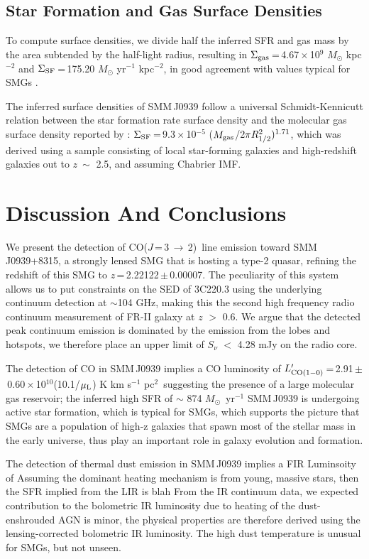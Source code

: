 \documentclass[twocolumn,apj,numberedappendix]{emulateapj}
\newcommand{\Msun}{\mbox{$M_{\odot}$}}
\newcommand{\CO}{\mbox{CO($J$\,=\,3\,$\rightarrow$\,2) }}
\newcommand{\Lp}{\mbox{$L^{\prime}_{\rm CO(1-0)}$}}
\newcommand{\LpU}{\mbox{K\,\,km\,\,s$^{-1}$\,\,pc$^2$}}
\newcommand{\pmOne}{\mbox{$^{-1}$}}
\begin{document}
\subsection{Star Formation and Gas Surface Densities}
To compute surface densities, we divide half the inferred SFR and gas mass by the area subtended by the half-light 
radius, resulting in $\Sigma_{\rm gas}$\,=\,4.67\,$\times$\,10$^9$\,\,\Msun\,\,kpc$^{-2}$ and $\Sigma_{\rm SF}$\,=\,175.20\,\,\Msun\,\,yr\pmOne\,\,kpc$^{-2}$, in good agreement with values typical for SMGs \citep{Tacconi08a}. 

The inferred surface densities of SMM\,J0939 follow a universal Schmidt-Kennicutt relation between the star formation rate
surface density and the molecular gas surface density reported by \citet{B07a}: $\Sigma_{\rm SF}$\,=\,9.3\,$\times$\,10$^{-5}$ ($M_{\rm gas}$/2$\pi R_{\rm 1/2}^2)^{1.71}$, which was derived using a sample consisting of local star-forming galaxies and high-redshift 
galaxies
out to $z\ \sim$ 2.5, and assuming Chabrier IMF. 

\section{Discussion And Conclusions} \label{sec:conclusions}
We present the detection of \CO line emission toward SMM\,J0939+8315, a strongly lensed SMG that is hosting a type-2 quasar, refining the redshift of this SMG to $z$\,=\,2.22122\,$\pm$\,0.00007. The peculiarity of this system allows us to put constraints on the SED of 3C220.3 using the underlying continuum detection at $\sim$104 GHz, making this the second high frequency radio continuum measurement of FR-II galaxy at $z$ $>$ 0.6. We argue that the detected peak continuum emission is dominated by the emission from the lobes and hotspots, we therefore place an upper limit of $S_\nu$ $<$ 4.28 mJy on the radio core. 

The detection of CO in SMM\,J0939 
implies a CO luminosity of \Lp\,=\,2.91\,$\pm$\,0.60\,$\times$\,10$^{10}$(10.1/$\mu_{\rm L}$)\,\,\LpU\, suggesting the presence of a large molecular gas reservoir; the inferred high SFR of $\sim$ 874 \Msun\ yr\pmOne 
 SMM\,J0939 is undergoing 
active star formation, which is typical for SMGs, 
which supports the picture that SMGs are a 
population of high-z galaxies that spawn most of the stellar mass in the early universe, thus play an important role 
in galaxy evolution and formation. 

The detection of thermal dust emission in SMM\,J0939 implies a FIR Luminsoity of 
Assuming the dominant heating mechanism is from young, massive stars, then the SFR implied from the LIR is blah
From the IR continuum data, we expected contribution to the bolometric IR luminosity due to heating of the dust-enshrouded AGN is minor, the physical properties are therefore derived using the lensing-corrected bolometric IR luminosity. The high dust temperature is unusual for SMGs, but not unseen. 
\end{document}
